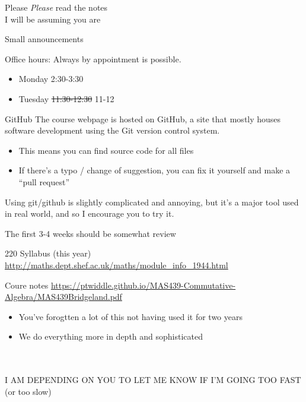 \documentclass{beamer}
\begin{document}
\begin{frame}[plain,c]

\begin{center}

\Huge

Please \emph{Please} read the notes \\
I will be assuming you are
\end{center}

\end{frame}

\begin{frame}{Small announcements}
  \begin{block}{Office hours:}
Always by appointment is possible.
    \begin{itemize}
    \item Monday 2:30-3:30
    \item Tuesday \st{11:30-12:30} \alert{11-12}
    \end{itemize}
\end{block}
    \begin{block}{GitHub}
      The course webpage is hosted on GitHub, a site that mostly houses software development using the Git version control system.
      \begin{itemize}
    \item This means you can find source code for all files
    \item If there's a typo / change of suggestion, you can fix it yourself and make a ``pull request''
    \end{itemize}
   Using git/github is slightly complicated and annoying, but it's a major tool used in real world, and so I encourage you to try it.
           \end{block}
\end{frame}

\begin{frame}{The first 3-4 weeks should be somewhat review}

\begin{block}{220 Syllabus (this year)}
  \url{http://maths.dept.shef.ac.uk/maths/module_info_1944.html}
\end{block}

\begin{block}{Coure notes}
  \url{https://ptwiddle.github.io/MAS439-Commutative-Algebra/MAS439Bridgeland.pdf}
  \end{block}
    
\begin{itemize}
\item You've forogtten a lot of this not having used it for two years
\item We do everything more in depth and sophisticated
\end{itemize}
\\~\\
\alert{I AM DEPENDING ON YOU TO LET ME KNOW IF I'M GOING TOO FAST} (or too slow)
\end{frame}
\end{document}
